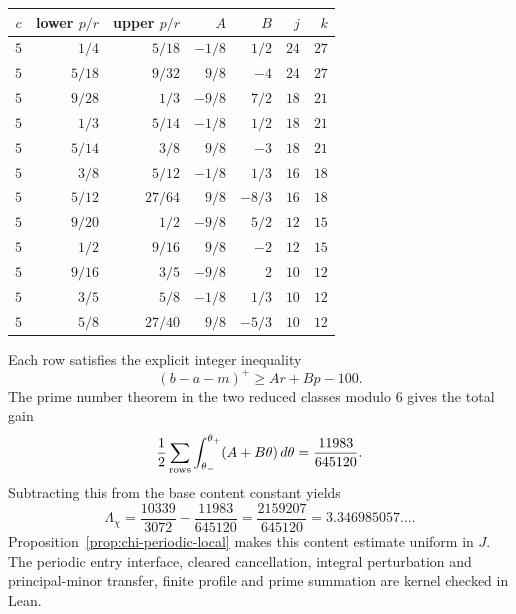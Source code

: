 \begin{center}
\begin{tabular}{crrrrrr}
\toprule
$c$ & lower $p/r$ & upper $p/r$ & $A$ & $B$ & $j$ & $k$\\
\midrule
$5$ & $1/4$ & $5/18$ & $-1/8$ & $1/2$ & $24$ & $27$\\
$5$ & $5/18$ & $9/32$ & $9/8$ & $-4$ & $24$ & $27$\\
$5$ & $9/28$ & $1/3$ & $-9/8$ & $7/2$ & $18$ & $21$\\
$5$ & $1/3$ & $5/14$ & $-1/8$ & $1/2$ & $18$ & $21$\\
$5$ & $5/14$ & $3/8$ & $9/8$ & $-3$ & $18$ & $21$\\
$5$ & $3/8$ & $5/12$ & $-1/8$ & $1/3$ & $16$ & $18$\\
$5$ & $5/12$ & $27/64$ & $9/8$ & $-8/3$ & $16$ & $18$\\
$5$ & $9/20$ & $1/2$ & $-9/8$ & $5/2$ & $12$ & $15$\\
$5$ & $1/2$ & $9/16$ & $9/8$ & $-2$ & $12$ & $15$\\
$5$ & $9/16$ & $3/5$ & $-9/8$ & $2$ & $10$ & $12$\\
$5$ & $3/5$ & $5/8$ & $-1/8$ & $1/3$ & $10$ & $12$\\
$5$ & $5/8$ & $27/40$ & $9/8$ & $-5/3$ & $10$ & $12$\\
\bottomrule
\end{tabular}
\end{center}
Each row satisfies the explicit integer inequality
\[
 (b-a-m)^+\ge Ar+Bp-100.
\]
The prime number theorem in the two reduced classes modulo $6$ gives
the total gain
\[
 \frac12\sum_{\rm rows}\int_{\theta_-}^{\theta_+}(A+B\theta)\,d\theta
   =\frac{11983}{645120}.
\]
Subtracting this from the base content constant yields
\begin{equation}\label{eq:chi-periodic-content}
 \Lambda_\chi=\frac{10339}{3072}-\frac{11983}{645120}
   =\frac{2159207}{645120}=3.346985057\ldots .
\end{equation}
Proposition~\ref{prop:chi-periodic-local} makes this content estimate
uniform in $J$.
The periodic entry interface, cleared cancellation, integral perturbation
and principal-minor transfer, finite profile and prime summation are
kernel checked in Lean.
